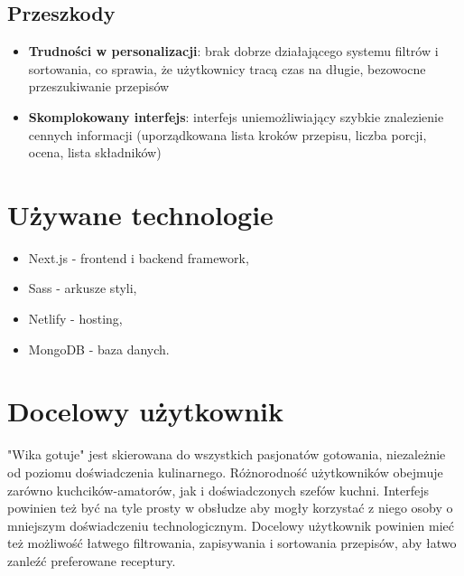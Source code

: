 \documentclass{article}
\begin{document}
\subsection{Przeszkody}
\begin{itemize}
    \item \textbf{Trudności w personalizacji}: brak dobrze działającego systemu filtrów i sortowania, co sprawia, że użytkownicy tracą czas na długie, bezowocne przeszukiwanie przepisów
    \item \textbf{Skomplokowany interfejs}: interfejs uniemożliwiający szybkie znalezienie cennych informacji (uporządkowana lista kroków przepisu, liczba porcji, ocena, lista składników)
\end{itemize}


\section{Używane technologie}
\begin{itemize}
    \item Next.js - frontend i backend framework,
    \item Sass - arkusze styli,
    \item Netlify - hosting,
    \item MongoDB - baza danych.
\end{itemize}

\section{Docelowy użytkownik}
"Wika gotuje" jest skierowana do wszystkich pasjonatów gotowania, niezależnie od poziomu doświadczenia kulinarnego. Różnorodność użytkowników obejmuje zarówno kuchcików-amatorów, jak 
i doświadczonych szefów kuchni. Interfejs powinien też być na tyle prosty w obsłudze aby mogły korzystać z niego osoby o mniejszym doświadczeniu technologicznym. Docelowy użytkownik
powinien mieć też możliwość łatwego filtrowania, zapisywania i sortowania przepisów, aby łatwo zanleźć preferowane receptury.

\end{document}
